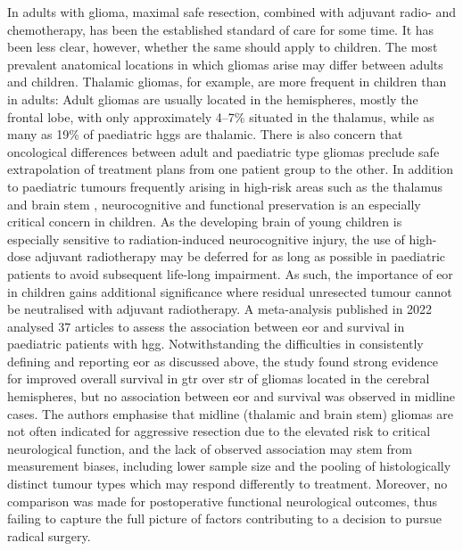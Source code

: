 In adults with glioma, maximal safe resection, combined with adjuvant radio- and chemotherapy, has been the established standard of care for some time.
It has been less clear, however, whether the same should apply to children.
The most prevalent anatomical locations in which gliomas arise may differ between adults and children\autocite{Duffau2004}.
Thalamic gliomas, for example, are more frequent in children than in adults\autocite{Cinalli2018,Palmisciano2021,GomezVecchio2021}:
Adult gliomas are usually located in the hemispheres, mostly the frontal lobe, with only approximately 4--7\%\autocite{GomezVecchio2021,Larjavaara2007} situated in the thalamus, while as many as 19\% of paediatric \glspl{hgg} are thalamic\autocite{McCrea2015}.
There is also concern that oncological differences between adult and paediatric type gliomas preclude safe extrapolation of treatment plans from one patient group to the other\autocite{Jones2012,Greuter2021}.
In addition to paediatric tumours frequently arising in high-risk areas such as the thalamus and brain stem \autocite{Ostrom2015}, neurocognitive and functional preservation is an especially critical concern in children.
As the developing brain of young children is especially sensitive to radiation-induced neurocognitive injury, the use of high-dose adjuvant radiotherapy may be deferred for as long as possible in paediatric patients to avoid subsequent life-long impairment\autocite{Padovani2012,Moxon-Emre2014}.
As such, the importance of \gls{eor} in children gains additional significance where residual unresected tumour cannot be neutralised with adjuvant radiotherapy.
A meta-analysis published in 2022 analysed 37 articles to assess the association between \gls{eor} and survival in paediatric patients with \gls{hgg}\autocite{Hatoum2022}.
Notwithstanding the difficulties in consistently defining and reporting \gls{eor} as discussed above, the study found strong evidence for improved overall survival in \gls{gtr} over \gls{str} of gliomas located in the cerebral hemispheres, but no association between \gls{eor} and survival was observed in midline cases.
The authors emphasise that midline (thalamic and brain stem) gliomas are not often indicated for aggressive resection due to the elevated risk to critical neurological function, and the lack of observed association may stem from measurement biases, including lower sample size and the pooling of histologically distinct tumour types which may respond differently to treatment.
Moreover, no comparison was made for postoperative functional neurological outcomes, thus failing to capture the full picture of factors contributing to a decision to pursue radical surgery.

